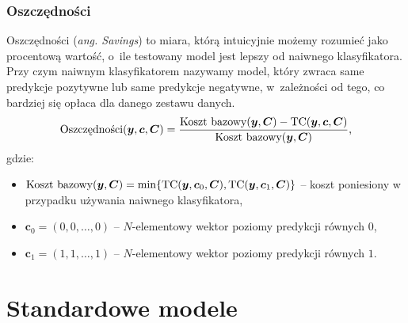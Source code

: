 \documentclass[inzynierska]{pwr_wmat_praca_dyplomowa}
\theoremstyle{plain}
\numberwithin{theorem}{chapter}
\theoremstyle{definition}
\numberwithin{theorem}{chapter}
\begin{document}
\subsubsection{Oszczędności}
Oszczędności (\textit{ang. Savings}) to miara, którą intuicyjnie możemy rozumieć jako procentową wartość, o~ile testowany model jest lepszy od naiwnego klasyfikatora. Przy czym naiwnym klasyfikatorem nazywamy model, który zwraca same predykcje pozytywne lub same predykcje negatywne, w~zależności od tego, co bardziej się opłaca dla danego zestawu danych.
\begin{equation}
	\label{oszczednosci}
	\text{Oszczędności}(\boldsymbol{y}, \boldsymbol{c}, \boldsymbol{C}) = \frac{\text{Koszt bazowy}(\boldsymbol{y}, \boldsymbol{C}) - \text{TC}(\boldsymbol{y}, \boldsymbol{c}, \boldsymbol{C})}{\text{Koszt bazowy}(\boldsymbol{y}, \boldsymbol{C})} \text{,}
\end{equation}
gdzie:
\begin{itemize}
	\item $ \text{Koszt bazowy}(\boldsymbol{y}, \boldsymbol{C}) = \min\{\text{TC}(\boldsymbol{y}, \boldsymbol{c}_0, \boldsymbol{C}), \text{TC}(\boldsymbol{y}, \boldsymbol{c}_1, \boldsymbol{C})\}$ -- koszt poniesiony w przypadku używania naiwnego klasyfikatora,
	\item $\boldsymbol{c}_0 = (0, 0, \dots, 0)$ -- $N$-elementowy wektor poziomy predykcji równych $0$,
	\item $\boldsymbol{c}_1 = (1, 1, \dots, 1)$ -- $N$-elementowy wektor poziomy predykcji równych $1$.
\end{itemize}{}

\section{Standardowe modele}
\end{document}
